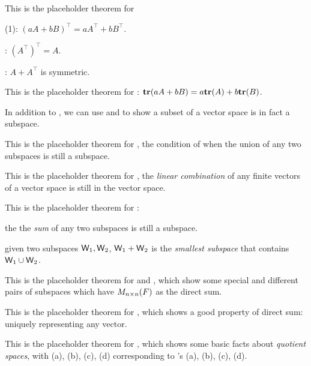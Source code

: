 \begin{additional theorem} \label{athm 1.2}
This is the placeholder theorem for

 (1): \((aA + bB)^\top = aA^\top + bB^\top\).

 : \((A^\top)^\top = A\).

 : \(A + A^\top\) is symmetric.
\end{additional theorem}

\begin{additional theorem} \label{athm 1.3}
This is the placeholder theorem for : \(\textbf{tr}(aA + bB) = a \textbf{tr}(A) + b \textbf{tr}(B)\).
\end{additional theorem}

\begin{additional theorem} \label{athm 1.4}
In addition to , we can use  and  to show a subset of a vector space is in fact a subspace.
\end{additional theorem}

\begin{additional theorem} \label{athm 1.5}
This is the placeholder theorem for , the condition of when the union of any two subspaces is still a subspace.
\end{additional theorem}

\begin{additional theorem} \label{athm 1.6}
This is the placeholder theorem for , the \emph{linear combination} of any finite vectors of a vector space is still in the vector space.
\end{additional theorem}

\begin{additional theorem} \label{athm 1.7}
This is the placeholder theorem for :

 the the \emph{sum} of any two subspaces is still a subspace.

 given two subspaces \(\textsf{W}_1, \textsf{W}_2\), \(\textsf{W}_1 + \textsf{W}_2\) is the \emph{smallest subspace} that contains \(\textsf{W}_1 \cup \textsf{W}_2\).
\end{additional theorem}

\begin{additional theorem} \label{athm 1.8}
This is the placeholder theorem for  and , which show some special and different pairs of subspaces which have \(M_{n \times n}(F)\) as the direct sum.
\end{additional theorem}

\begin{additional theorem} \label{athm 1.9}
This is the placeholder theorem for , which shows a good property of direct sum: uniquely representing any vector.
\end{additional theorem}

\begin{additional theorem} \label{athm 1.10}
This is the placeholder theorem for , which shows some basic facts about \emph{quotient spaces}, with (a), (b), (c), (d) corresponding to 's (a), (b), (c), (d).
\end{additional theorem}
